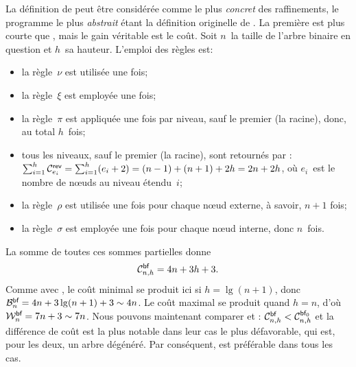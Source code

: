 La définition de  peut être considérée
comme le plus \emph{concret} des raffinements, le programme le plus
\emph{abstrait} étant la définition originelle de
. La première est plus
courte que , mais le gain
véritable est le coût. Soit \(n\)~la taille de l'arbre binaire en
question et \(h\)~sa hauteur. L'emploi
des règles est:
\begin{itemize}

  \item la règle~\(\nu\) est utilisée une fois;

  \item la règle~\(\xi\) est employée une fois;

  \item la règle~\(\pi\) est appliquée une fois par niveau, sauf le
    premier (la racine), donc, au total \(h\)~fois;

  \item tous les niveaux, sauf le premier (la racine), sont retournés
    par : \(\sum_{i=1}^{h}\C{\fun{rev}}{e_i} =
    \sum_{i=1}^{h}(e_i+2) = (n-1)+(n+1)+ 2h = 2n +
    2h\), où \(e_i\)~est le nombre de
    nœuds au niveau étendu~\(i\);

  \item la règle~\(\rho\) est utilisée une fois pour chaque nœud
    externe, à savoir, \(n+1\) fois;

  \item la règle~\(\sigma\) est employée une fois pour chaque nœud
    interne, donc \(n\)~fois.

\end{itemize}
La somme de toutes ces sommes partielles donne
\begin{equation*}
\C{\fun{bf}}{n,h} = 4n + 3h + 3.\index{bf@$\C{\fun{bf}}{n,h}$}
\end{equation*}
Comme avec , le coût
minimal se produit ici si \(h = \lg(n+1)\), donc \(\B{\fun{bf}}{n} =
4n + 3\lg(n+1) + 3 \sim 4n\). Le coût
maximal se produit quand \(h=n\), d'où \(\W{\fun{bf}}{n} = 7n + 3 \sim
7n\). Nous pouvons maintenant comparer
 et
: \(\C{\fun{bf}}{n,h} <
\C{\fun{bf}_0}{n,h}\)
 et la différence de coût est la plus
notable dans leur cas le plus défavorable, qui est, pour les deux, un
arbre dégénéré. Par conséquent,  est préférable dans tous
les cas.

